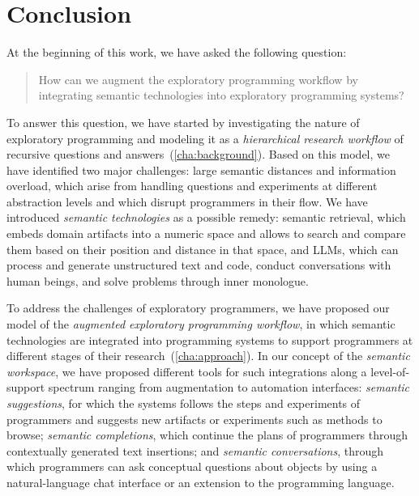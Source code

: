 
\chapter{Conclusion}
\label{cha:conclusion}

At the beginning of this work, we have asked the following question:
%
\begin{quote}
	How can we augment the exploratory programming workflow by integrating semantic technologies into exploratory programming systems?
\end{quote}

To answer this question, we have started by investigating the nature of exploratory programming and modeling it as a \emph{hierarchical research workflow} of recursive questions and answers~(\cref{cha:background}).
Based on this model, we have identified two major challenges: large semantic distances and information overload, which arise from handling questions and experiments at different abstraction levels and which disrupt programmers in their flow.
We have introduced \emph{semantic technologies} as a possible remedy: semantic retrieval, which embeds domain artifacts into a numeric space and allows to search and compare them based on their position and distance in that space, and LLMs, which can process and generate unstructured text and code, conduct conversations with human beings, and solve problems through inner monologue.

To address the challenges of exploratory programmers, we have proposed our model of the \emph{augmented exploratory programming workflow}, in which semantic technologies are integrated into programming systems to support programmers at different stages of their research~(\cref{cha:approach}).
In our concept of the \emph{semantic workspace}, we have proposed different tools for such integrations along a level-of-support spectrum ranging from augmentation to automation interfaces:
\emph{semantic suggestions}, for which the systems follows the steps and experiments of programmers and suggests new artifacts or experiments such as methods to browse;
\emph{semantic completions}, which continue the plans of programmers through contextually generated text insertions;
and \emph{semantic conversations}, through which programmers can ask conceptual questions about objects by using a natural-language chat interface or an extension to the programming language.

